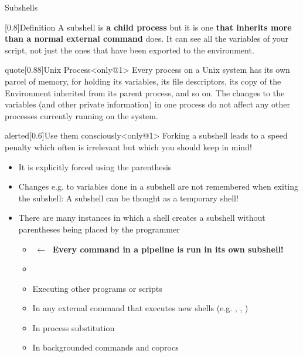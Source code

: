 \begin{frame}{Subshells}
    \vspace{-8mm}
    \begin{overlayarea}{\textwidth}{0.7\textheight}
        \begin{varblock}{}[0.8\textwidth]{Definition}
            A subshell is \textbf{a child process} but it is one \textbf{that inherits more than a normal external command} does.
            It can see all the variables of your script, not just the ones that have been exported to the environment.
        \end{varblock}
        \begin{varblock}{quote}[0.88\textwidth]{Unix Process}<only@1>
            Every process on a Unix system has its own parcel of memory, for holding its variables, its file descriptors, its copy of the Environment inherited from its parent process, and so on.
            The changes to the variables (and other private information) in one process do not affect any other processes currently running on the system.
        \end{varblock}
        \begin{varblock}{alerted}[0.6\textwidth]{Use them consciously}<only@1>
            Forking a subshell leads to a speed penalty which often is irrelevant but which you should keep in mind!
        \end{varblock}
        \begin{itemize}[<2>]
            \item It is explicitly forced using the parenthesis \PB{\texttt{(\ldots)}}
            \item Changes e.g. to variables done in a subshell are not remembered when exiting the subshell: A subshell can be thought as a temporary shell!
            \item There are many instances in which a shell creates a subshell without parentheses being placed by the programmer
                  \begin{itemize}
                      \item {} $\;\longleftarrow\;$ \alert{\textbf{Every command in a pipeline is run in its own subshell!}}
                      \item {}
                      \item Executing other programs or scripts
                      \item In any external command that executes new shells (e.g. , , )
                      \item In process substitution
                      \item In backgrounded commands and coprocs
                  \end{itemize}
        \end{itemize}
    \end{overlayarea}
\end{frame}
